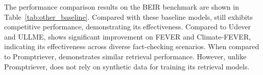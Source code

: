 The performance comparison results on the BEIR benchmark are shown in Table~\ref{tab:other_baseline}. 
Compared with these baseline models, \method{} still exhibits competitive performance, demonstrating its effectiveness. Compared to Udever and ULLME, \method{} shows significant improvement on FEVER and Climate-FEVER, indicating its effectiveness across diverse fact-checking scenarios. 
When compared to Promptriever, \method{} demonstrates similar retrieval performance. However, unlike Promptriever, \method{} does not rely on synthetic data for training its retrieval models.


